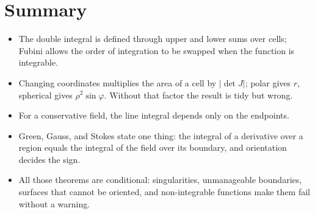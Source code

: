 \section{Summary}
\begin{ringkasan}
\begin{itemize}
\item The double integral is defined through upper and lower sums over cells;
Fubini allows the order of integration to be swapped when the function is integrable.
\item Changing coordinates multiplies the area of a cell by $|\det J|$; polar gives
$r$, spherical gives $\rho^{2}\sin\varphi$. Without that factor the result is tidy but
wrong.
\item For a conservative field, the line integral depends only on the endpoints.
\item Green, Gauss, and Stokes state one thing: the integral of a derivative over a region
equals the integral of the field over its boundary, and orientation decides the sign.
\item All those theorems are conditional: singularities, unmanageable boundaries, surfaces that cannot
be oriented, and non-integrable functions make them fail without a warning.
\end{itemize}
\end{ringkasan}

